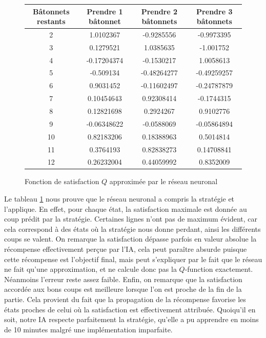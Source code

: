 \begin{figure}[h]
\centering
\begin{tabular}{|c|c|c|c|}
\hline
Bâtonnets restants & Prendre 1 bâtonnet & Prendre 2 bâtonnets & Prendre 3 bâtonnets\\
\hline
2 & \cellcolor{green} 1.0102367 & -0.9285556 & -0.9973395\\
\hline
3 & 0.1279521 & \cellcolor{green} 1.0385635 & -1.001752\\
\hline
4 & -0.17204374 & -0.1530217 & \cellcolor{green} 1.0058613\\
\hline
5 & -0.509134 & -0.48264277 & -0.49259257\\
\hline
6 & \cellcolor{green} 0.9031452 & -0.11602497 & -0.24787879\\
\hline
7 & 0.10454643 & \cellcolor{green} 0.92308414 & -0.1744315\\
\hline
8 & 0.12821698 & 0.2924267 & \cellcolor{green} 0.9102776\\
\hline
9 & -0.06348622 & -0.0588069 & -0.05864894\\
\hline
10 & \cellcolor{green} 0.82183206 & 0.18388963 & 0.5014814\\
\hline
11 & 0.3764193 & \cellcolor{green} 0.82838273 & 0.14708841\\
\hline
12 & 0.26232004 & 0.44059992 & \cellcolor{green} 0.8352009\\
\hline
\end{tabular}
\caption{Fonction de satisfaction $Q$ approximée par le réseau neuronal}
\label{tab:Qfunction}
\end{figure}

Le tableau \ref{tab:Qfunction} nous prouve que le réseau neuronal a compris la stratégie et l'applique. En effet, pour chaque état, la satisfaction maximale est donnée
au coup prédit par la stratégie. Certaines lignes n'ont pas de maximum évident, car cela correspond à des états où la stratégie nous donne perdant, ainsi les différents
coups se valent. On remarque la satisfaction dépasse parfois en valeur absolue la récompense effectivement perçue par l'IA, cela peut paraître absurde puisque cette 
récompense est l'objectif final, mais peut s'expliquer par le fait que le réseau ne fait qu'une approximation, et ne calcule donc pas la $Q$-function exactement.
Néanmoins l'erreur reste assez faible. Enfin, on remarque que la satisfaction accordée aux bons coups est meilleure lorsque l'on est proche de la fin de la partie.
Cela provient du fait que la propagation de la récompense favorise les états proches de celui où la satisfaction est effectivement attribuée. Quoiqu'il en soit, notre IA
respecte parfaitement la stratégie, qu'elle a pu apprendre en moins de 10 minutes malgré une implémentation imparfaite.


